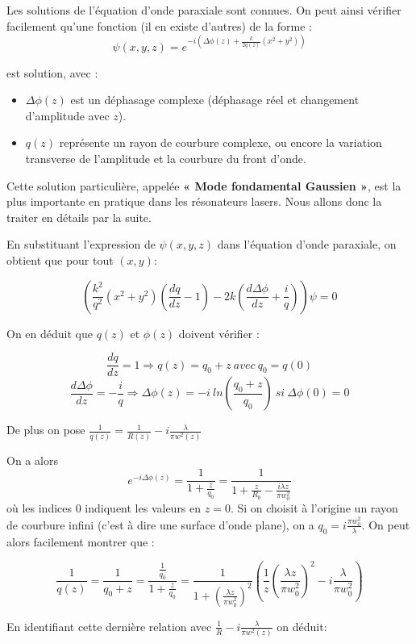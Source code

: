 \documentclass{book}
\begin{document}
Les solutions de l'équation d'onde paraxiale sont connues. On peut ainsi vérifier facilement qu'une fonction (il en existe d'autres) de la forme :
$$\psi (x, y, z) = e^{-i\left(\Delta \phi (z) + \frac k {2q(z)}(x^2+y^2)\right)}$$

est solution, avec :
\begin{itemize}
    \item $\Delta\phi(z)$ est un déphasage complexe (déphasage réel et changement d'amplitude avec $z$).
    \item $q(z)$ représente un rayon de courbure complexe, ou encore la variation transverse de l'amplitude et la courbure du front d'onde.
\end{itemize}

Cette solution particulière, appelée \textbf{\color{red}« Mode fondamental Gaussien »}, est la plus importante en pratique dans les résonateurs lasers. Nous allons donc la traiter en détails par la suite.

En substituant l'expression de $\psi(x, y, z)$ dans l'équation d'onde paraxiale, on obtient que pour tout $(x,y)$:

$$\left( \frac {k^2}{q^2} (x^2+y^2) \left(\frac {dq}{dz} -1 \right) -2k \left( \frac{d\Delta\phi}{dz} +
            \frac i
            q\right)\right)\psi = 0$$

On en déduit que $q(z)$ et $\phi(z)$ doivent vérifier :

$$\frac{dq}{dz}=1 \Rightarrow q(z)=q_0+z\ avec\
            q_0=q(0)$$
$$\frac{d\Delta \phi}{dz}=-\frac i q \Rightarrow \Delta\phi(z)=-i\ ln\left(\frac{q_0+z}{q_0}\right)\ si\
            \Delta
            \phi(0)=0$$
            
De plus on pose $\frac 1 {q(z)}=\frac 1 {R(z)}-i\frac {\lambda}{\pi w^2(z)}$

On a alors
$$e^{-i\Delta\phi(z)} = \frac 1 {1 + \frac z {q_0}}=\frac 1 {1+\frac z {R_0}-\frac{i\lambda
            z}{\pi
            w_0^2}}$$
où les indices 0 indiquent les valeurs en $z=0$. Si on choisit à l'origine un rayon de courbure infini (c'est à dire une surface d'onde plane), on a $q_0=i\frac{\pi w_0^2}{\lambda}$. On peut alors facilement montrer que :

$$\frac 1 {q(z)}=\frac 1 {q_0 + z} = \frac {\frac{1}{q_0}} {1+\frac z {q_0}}= \frac 1 {1+\left(\frac
            {\lambda
            z}{\pi w_0^2}\right)^2}\left(\frac 1 z \left( \frac {\lambda z}{\pi w_0^2} \right)^2-i \frac \lambda {\pi
            w_0^2}
            \right)$$

En identifiant cette dernière relation avec $\frac 1 R -i \frac \lambda {\pi w^2(z)}$ on déduit:
\end{document}
